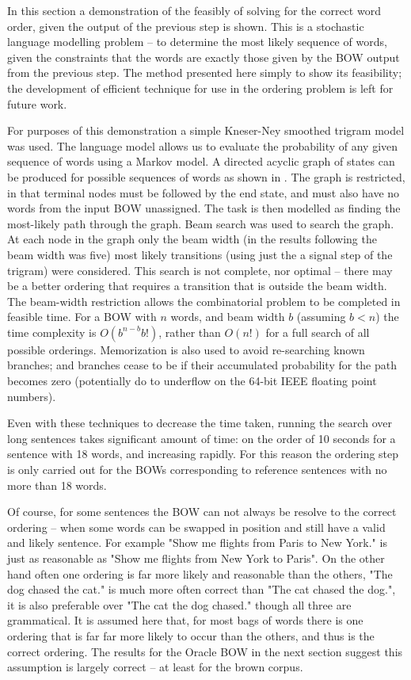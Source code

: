 \documentclass[11pt]{article}
\numberwithin{equation}{section}
\numberwithin{figure}{section}
\theoremstyle{plain}
\theoremstyle{definition}
\begin{document}
In this section a demonstration of the feasibly of solving for the correct word order, given the output of the previous step is shown. This is a stochastic language modelling problem -- to determine the most likely sequence of words, given the constraints that the words are exactly those given by the BOW output from the previous step. The method presented here simply to show its feasibility; the development of efficient technique for use in the ordering problem is left for future work.


For purposes of this demonstration a simple Kneser-Ney smoothed trigram model \parencite{kneser1995improved} was used. The language model allows us to evaluate the probability of any given sequence of words using a Markov model.
A directed acyclic graph of states can be produced for possible sequences of words as shown in . The graph is restricted, in that terminal nodes must be followed by the end state, and must also have no words from the input BOW unassigned. The task is then modelled as finding the most-likely path through the graph.
Beam search was used to search the graph. At each node in the graph only the beam width (in the results following the beam width was five) most likely transitions (using just the a signal step of the trigram) were considered. This search is not complete, nor optimal -- there may be a better ordering that requires a transition that is outside the beam width. The beam-width restriction allows the combinatorial problem to be completed in feasible time. For a BOW with $n$ words, and beam width $b$ (assuming $b<n$) the time complexity is $O(b^{n-b}b!)$, rather than $O(n!)$ for a full search of all possible orderings. Memorization is also used to avoid re-searching known branches; and branches cease to be  if their accumulated probability for the path becomes zero (potentially do to underflow on the 64-bit IEEE floating point numbers).

Even with these techniques to decrease the time taken, running the search over long sentences takes significant amount of time: on the order of 10 seconds for a sentence with 18 words, and increasing rapidly. For this reason the ordering step is only carried out for the BOWs corresponding to reference sentences with no more than 18 words.
 
  
Of course, for some sentences the BOW can not always be resolve to the correct ordering -- when some words can be swapped in position and still have a valid and likely sentence. For example "Show me flights from Paris to New York." is just as reasonable as  "Show me flights from New York to Paris". On the other hand often one ordering is far more likely and reasonable than the others, "The dog chased the cat." is much more often correct than "The cat chased the dog.", it is also preferable over "The cat the dog chased." though all three are grammatical. It is assumed here that, for most bags of words there is one ordering that is far far more likely to occur than the others, and thus is the correct ordering. The results for the Oracle BOW in the next section suggest this assumption is largely correct -- at least for the brown corpus.
\end{document}
